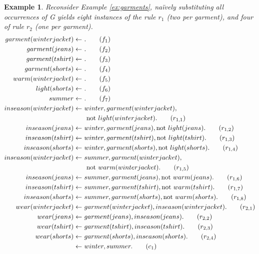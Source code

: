 \documentclass[final]{vutinfth} %
\newtheorem{example}{Example}[chapter]
\newcommand{\fail}{\mathrm{not } \ \xspace}
\newcommand{\from}{\ensuremath{\leftarrow}}
\begin{document}
\begin{example}
\label{ex:garmentsground}
Reconsider Example \ref{ex:garments}, na{\"i}vely substituting all occurrences of \emph{G} yields eight instances of the rule $r_1$ (two per garment), and four of rule $r_2$ (one per garment).
\begin{align}
garment(winterjacket)\from& \ . \tag{$f_1$}\label{ex:garmentsground:garments:begin}\\
garment(jeans)\from& \ .\tag{$f_2$}\\
garment(tshirt)\from& \ .\tag{$f_3$}\\
garment(shorts)\from& \ .\tag{$f_4$}\label{ex:garmentsground:garments:end}\\
warm(winterjacket)\from& \ .\tag{$f_5$}\label{ex:garmentsground:style:begin}\\
light(shorts)\from& \ .\tag{$f_6$}\label{ex:garmentsground:style:end}\\
summer\from& \ .\tag{$f_7$}\label{ex:garmentsground:season}\\
inseason(winterjacket) \from& \ winter, garment(winterjacket), \notag\\
& \ \ \fail light(winterjacket). \tag{$r_{1,1}$}\label{ex:garmentsground:inseason:begin}\\
inseason(jeans) \from& \ winter, garment(jeans), \fail light(jeans).\tag{$r_{1,2}$}\\
inseason(tshirt) \from& \ winter, garment(tshirt), \fail light(tshirt).\tag{$r_{1,3}$}\\
inseason(shorts) \from& \ winter, garment(shorts), \fail light(shorts).\tag{$r_{1,4}$}\\
inseason(winterjacket) \from& \ summer, garment(winterjacket), \notag\\
& \ \ \fail warm(winterjacket).\tag{$r_{1,5}$}\\
inseason(jeans) \from& \ summer, garment(jeans), \fail warm(jeans).\tag{$r_{1,6}$}\\
inseason(tshirt) \from& \ summer, garment(tshirt), \fail warm(tshirt).\tag{$r_{1,7}$}\\
inseason(shorts) \from& \ summer, garment(shorts), \fail warm(shorts). \tag{$r_{1,8}$}\label{ex:garmentsground:inseason:end}\\
wear(winterjacket) \from& \ garment(winterjacket), inseason(winterjacket).\tag{$r_{2,1}$}\\
wear(jeans) \from& \ garment(jeans), inseason(jeans).\tag{$r_{2,2}$}\\
wear(tshirt) \from& \ garment(tshirt), inseason(tshirt).\tag{$r_{2,3}$}\\
wear(shorts) \from& \ garment(shorts), inseason(shorts).\tag{$r_{2,4}$}\\
\from& \ winter, summer.\tag{$c_1$} \label{ex:garmentsground:seasons}
\end{align}
\end{example}
\end{document}
